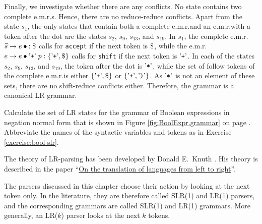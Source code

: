 Finally, we investigate whether there are any conflicts.  No state contains two complete e.m.r.s.  Hence, there are
no reduce-reduce conflicts.  Apart from the state $s_1$, the only states that contain both a complete e.m.r.\@ and
an e.m.r.\@ with a token after the dot are the states $s_2$, $s_9$, $s_{13}$, and $s_{19}$.  In $s_1$, the complete
e.m.r.\@ $\widehat{s} \rightarrow e \mdot: \symbol{36}$ calls for \texttt{accept} if the next token is
$\symbol{36}$, while the e.m.r.\@ $e \rightarrow e \mdot \saquoted{+}\; p: \{\saquoted{+}, \symbol{36}\}$ calls for
\texttt{shift} if the next token is $\mbox{'\texttt{+}'}$.  In each of the states $s_2$, $s_9$, $s_{13}$, and $s_{19}$, the
token after the dot is $\mbox{'\texttt{*}'}$, while the set of follow tokens of the complete e.m.r.\@ is either
$\{\saquoted{+}, \symbol{36}\}$ or $\{\mbox{'\texttt{+}'}, \mbox{'\texttt{)}'}\}$.  As $\mbox{'\texttt{*}'}$ is not an element of these
sets, there are no shift-reduce conflicts either.  Therefore, the grammar is a canonical LR grammar.

\exerciseEng\label{exercise:bool-lr}
Calculate the set of LR states for the grammar of Boolean expressions in negation normal form that is shown in
Figure \ref{fig:BoolExpr.grammar} on page \pageref{fig:BoolExpr.grammar}.  Abbreviate the names of the syntactic
variables and tokens as in Exercise \ref{exercise:bool-slr}.
\eox
\vspace*{0.2cm}

\remarkEng
The theory of LR-parsing has been developed by Donald E.~Knuth \cite{knuth:65}.  
His theory is described in the paper 
``\href{https://doi.org/10.1016/S0019-9958(65)90426-2}{On the translation of languages from left to right}''.
\eox
\vspace*{0.3cm}

\remarkEng
The parsers discussed in this chapter choose their action by looking at the next token only.  In the
literature, they are therefore called SLR(1) and LR(1) parsers, and the corresponding grammars are called SLR(1)
and LR(1) grammars.  More generally, an LR($k$) parser looks at the next $k$ tokens.
\eox

